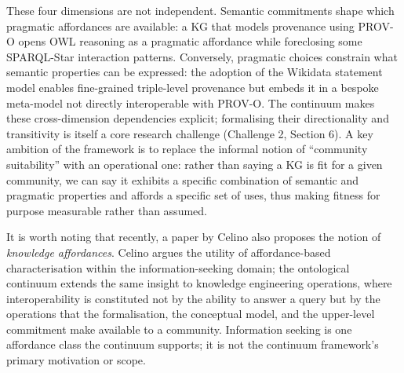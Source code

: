 \documentclass[runningheads]{llncs}
\newcommand{\add}[1]{\textcolor{addedcolor}{#1}}
\begin{document}
\add{These four dimensions are not independent. Semantic commitments shape which pragmatic affordances are available: a KG that models provenance using PROV-O opens OWL reasoning as a pragmatic affordance while foreclosing some SPARQL-Star interaction patterns. Conversely, pragmatic choices constrain what semantic properties can be expressed: the adoption of the Wikidata statement model enables fine-grained triple-level provenance but embeds it in a bespoke meta-model not directly interoperable with PROV-O. The continuum makes these cross-dimension dependencies explicit; formalising their directionality and transitivity is itself a core research challenge (Challenge 2, Section 6). A key ambition of the framework is to replace the informal notion of ``community suitability'' with an operational one: rather than saying a KG is fit for a given community, we can say it exhibits a specific combination of semantic and pragmatic properties and affords a specific set of uses, thus making fitness for purpose measurable rather than assumed.}

\add{It is worth noting that recently, a paper by Celino also proposes the notion of \emph{knowledge affordances}. Celino argues the utility of affordance-based characterisation within the information-seeking domain; the ontological continuum extends the same insight to knowledge engineering operations, where interoperability is constituted not by the ability to answer a query but by the operations that the formalisation, the conceptual model, and the upper-level commitment make available to a community. Information seeking is one affordance class the continuum supports; it is not the continuum framework's primary motivation or scope.
}
\end{document}
